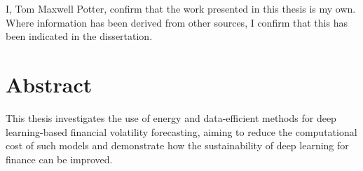 \documentclass[a4paper, 11pt]{report}
\begin{document}
    I, Tom Maxwell Potter, confirm that the work presented in this thesis is my own. Where information has been derived from other sources, I confirm that this has been indicated in the dissertation.


    \newpage

    \chapter*{Abstract}

    This thesis investigates the use of energy and data-efficient methods for deep learning-based financial volatility forecasting, aiming to reduce the computational cost of such models and demonstrate how the sustainability of deep learning for finance can be improved.
\end{document}
